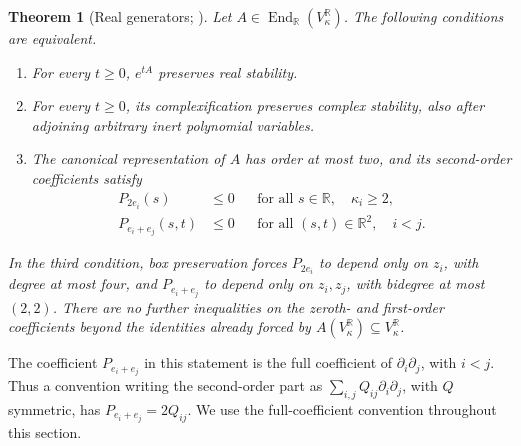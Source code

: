 \documentclass[reqno]{amsart}
\newtheorem{theorem}{Theorem}[section]
\theoremstyle{definition}
\theoremstyle{remark}
\newcommand{\R}{\mathbb R}
\begin{document}
\begin{theorem}[Real generators; \cite{WeiGenerators2026}]
\label{gen:main-real}
Let \(A\in\operatorname{End}_{\R}(V_\kappa^\R)\).  The following conditions
are equivalent.
\begin{enumerate}
\item For every \(t\geq0\), \(e^{tA}\) preserves real stability.
\item For every \(t\geq0\), its complexification preserves complex stability,
also after adjoining arbitrary inert polynomial variables.
\item The canonical representation of \(A\) has order at most two, and its
second-order coefficients satisfy
\begin{align}
 P_{2e_i}(s)&\leq0
 &&\text{for all }s\in\R,\quad \kappa_i\geq2,
 \label{gen:eq-real-unary}\\
 P_{e_i+e_j}(s,t)&\leq0
 &&\text{for all }(s,t)\in\R^2,\quad i<j.
 \label{gen:eq-real-pair}
\end{align}
\end{enumerate}
In the third condition, box preservation forces \(P_{2e_i}\) to depend only
on \(z_i\), with degree at most four, and \(P_{e_i+e_j}\) to depend only on
\(z_i,z_j\), with bidegree at most \((2,2)\).  There are no further
inequalities on the zeroth- and first-order coefficients beyond the
identities already forced by \(A(V_\kappa^\R)\subseteq V_\kappa^\R\).
\end{theorem}

The coefficient \(P_{e_i+e_j}\) in this statement is the full coefficient
of \(\partial_i\partial_j\), with \(i<j\).  Thus a convention writing the
second-order part as \(\sum_{i,j}Q_{ij}\partial_i\partial_j\), with \(Q\)
symmetric, has \(P_{e_i+e_j}=2Q_{ij}\).
We use the full-coefficient convention throughout this section.
\end{document}
